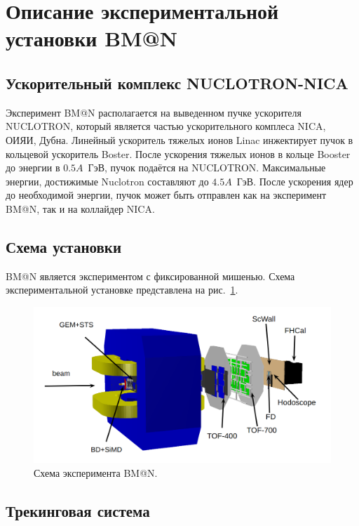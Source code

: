 
\section{Описание экспериментальной установки BM@N}

\subsection{Ускорительный комплекс NUCLOTRON-NICA}

Эксперимент BM@N располагается на выведенном пучке ускорителя NUCLOTRON, который является частью ускорительного комплеса NICA, ОИЯИ, Дубна.
Линейный ускоритель тяжелых ионов Linac инжектирует пучок в кольцевой ускоритель Boster.
После ускорения тяжелых ионов в кольце Booster до энергии в $0.5A$~ГэВ, пучок подаётся на NUCLOTRON.
Максимальные энергии, достижимые Nuclotron составляют до $4.5A$~ГэВ.
После ускорения ядер до необходимой энергии, пучок может быть отправлен как на эксперимент BM@N, так и на коллайдер NICA.

\subsection{Схема установки}

BM@N является экспериментом с фиксированной мишенью.
Схема экспериментальной установке представлена на рис.~\ref{fig:bmn_layout}.
%
\begin{figure}[ht]
\begin{center}
\includegraphics[width=0.95\linewidth]{images/BM@N_layout.png}
\caption{Схема эксперимента BM@N.}
\label{fig:bmn_layout}
\end{center}
\end{figure}

\subsection{Трекинговая система}


